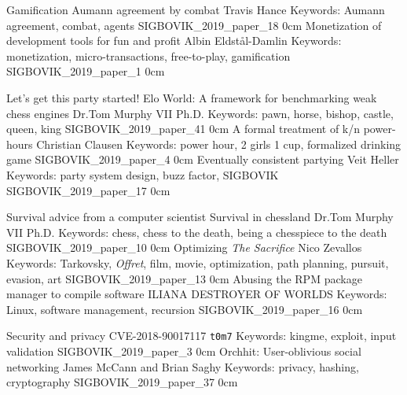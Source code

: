 \renewcommand{\thepage}{\roman{page}}
\setcounter{page}{3}

\newpage
\renewcommand{\thepage}{\arabic{page}}
\setcounter{page}{1}

\addtrack
	{}{Gamification}
\addpaper
	{Aumann agreement by combat}
	{Travis Hance}
	{Keywords: Aumann agreement, combat, agents}
	{SIGBOVIK_2019_paper_18}
	{0cm}
	{}
\addpaper
	{Monetization of development tools for fun and profit}
	{Albin Eldstål-Damlin}
	{Keywords: monetization, micro-transactions, free-to-play, gamification}
	{SIGBOVIK_2019_paper_1}
	{0cm}
	{}

\addtrack
	{}{Let's get this party started!}
\addpaper
	{Elo World: A framework for benchmarking weak chess engines}
	{Dr.\@ Tom Murphy VII Ph.D.}
	{Keywords: pawn, horse, bishop, castle, queen, king}
	{SIGBOVIK_2019_paper_41}
	{0cm}
	{}
\addpaper
	{A formal treatment of k/n power-hours}
	{Christian Clausen}
	{Keywords: power hour, 2 girls 1 cup, formalized drinking game}
	{SIGBOVIK_2019_paper_4}
	{0cm}
	{}
\addpaper
	{Eventually consistent partying}
	{Veit Heller}
	{Keywords: party system design, buzz factor, SIGBOVIK}
	{SIGBOVIK_2019_paper_17}
	{0cm}
	{}

\addtrack
	{}{Survival advice from a computer scientist}
\addpaper
	{Survival in chessland}
	{Dr.\@ Tom Murphy VII Ph.D.}
	{Keywords: chess, chess to the death, being a chesspiece to the death}
	{SIGBOVIK_2019_paper_10}
	{0cm}
	{}
\addpaper
	{Optimizing \textit{The Sacrifice}}
	{Nico Zevallos}
	{Keywords: Tarkovsky, \textit{Offret}, film, movie, optimization, path planning, pursuit, evasion, art}
	{SIGBOVIK_2019_paper_13}
	{0cm}
	{}
\addpaper
	{Abusing the RPM package manager to compile software}
	{ILIANA DESTROYER OF WORLDS}
	{Keywords: Linux, software management, recursion}
	{SIGBOVIK_2019_paper_16}
	{0cm}
	{}

\addtrack
	{}{Security and privacy}
\addpaper
	{CVE-2018-90017117}
	{\texttt{t0m7}}
	{Keywords: kingme, exploit, input validation}
	{SIGBOVIK_2019_paper_3}
	{0cm}
	{}
\addpaper
	{Orchhit: User-oblivious social networking}
	{James McCann and Brian Saghy}
	{Keywords: privacy, hashing, cryptography}
	{SIGBOVIK_2019_paper_37}
	{0cm}
	{}

